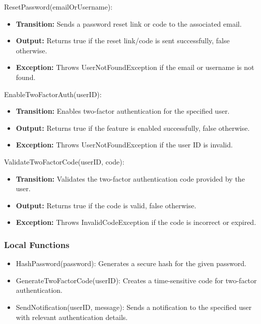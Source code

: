 \documentclass[12pt, titlepage]{article}
\begin{document}
\noindent ResetPassword(emailOrUsername):
\begin{itemize}
  \item \textbf{Transition:} Sends a password reset link or code to the associated email.
  \item \textbf{Output:} Returns true if the reset link/code is sent successfully, false otherwise.
  \item \textbf{Exception:} Throws UserNotFoundException if the email or username is not found.
\end{itemize}

\noindent EnableTwoFactorAuth(userID):
\begin{itemize}
  \item \textbf{Transition:} Enables two-factor authentication for the specified user.
  \item \textbf{Output:} Returns true if the feature is enabled successfully, false otherwise.
  \item \textbf{Exception:} Throws UserNotFoundException if the user ID is invalid.
\end{itemize}

\noindent ValidateTwoFactorCode(userID, code):
\begin{itemize}
  \item \textbf{Transition:} Validates the two-factor authentication code provided by the user.
  \item \textbf{Output:} Returns true if the code is valid, false otherwise.
  \item \textbf{Exception:} Throws InvalidCodeException if the code is incorrect or expired.
\end{itemize}

\subsubsection{Local Functions}

\begin{itemize}
  \item HashPassword(password): Generates a secure hash for the given password.
  \item GenerateTwoFactorCode(userID): Creates a time-sensitive code for two-factor authentication.
  \item SendNotification(userID, message): Sends a notification to the specified user with relevant authentication details.
\end{itemize}

\newpage
\end{document}

